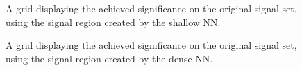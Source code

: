 \begin{figure}
    \caption{A grid displaying the achieved significance on the original signal set, using the signal region 
    created by the shallow \ac{NN}.}
    \label{fig:NNshallowGridSig}
\end{figure}
\begin{figure}
    \caption{A grid displaying the achieved significance on the original signal set, using the signal region 
    created by the dense \ac{NN}.}
    \label{fig:NNGridSig}
\end{figure}
